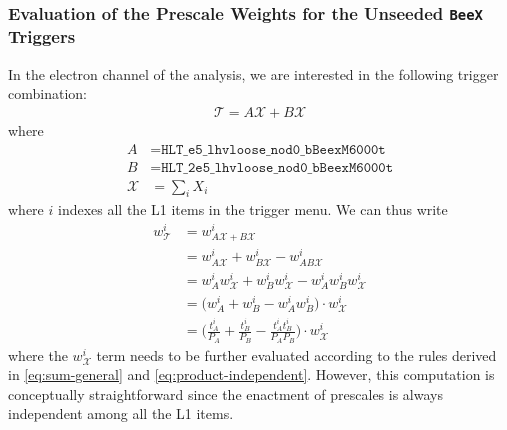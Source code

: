 \subsubsection{Evaluation of the Prescale Weights for the Unseeded \texttt{BeeX} Triggers}
\label{subsubsec:app-prw-evaluation-of-prescale-weights-for-beex}
In the electron channel of the analysis, we are interested in the following trigger combination:
\begin{align}
    \mathcal{T}=A\mathcal{X}+B\mathcal{X}
\end{align}
where \begin{align}
    A&=\texttt{HLT\_e5\_lhvloose\_nod0\_bBeexM6000t}\\
    B&=\texttt{HLT\_2e5\_lhvloose\_nod0\_bBeexM6000t}\\
    \mathcal{X}&=\sum_i X_i
\end{align}
where $i$ indexes all the L1 items in the trigger menu. We can thus write 
\begin{align}
    w^i_{\mathcal{T}}&=w^i_{A\mathcal{X}+B\mathcal{X}}\\
    &=w^i_{A\mathcal{X}}+w^i_{B\mathcal{X}}-w^i_{AB\mathcal{X}}\\
    &=w^i_{A}w^i_{\mathcal{X}}+w^i_{B}w^i_{\mathcal{X}}-w^i_Aw^i_Bw^i_{\mathcal{X}}\\
    &=\big(w^i_{A}+w^i_{B}-w^i_Aw^i_B\big)\cdot w^i_{\mathcal{X}}\\
    &=\bigg(\frac{t^i_A}{P_A}+\frac{t^i_B}{P_B}-\frac{t^i_At^i_B}{P_AP_B}\bigg)\cdot w^i_{\mathcal{X}}
\end{align}
where the $w^i_{\mathcal{X}}$ term needs to be further evaluated according to the rules derived in \eqref{eq:sum-general} and \eqref{eq:product-independent}. %
However, this computation is conceptually straightforward since the enactment of prescales is always independent among all the L1 items. %

